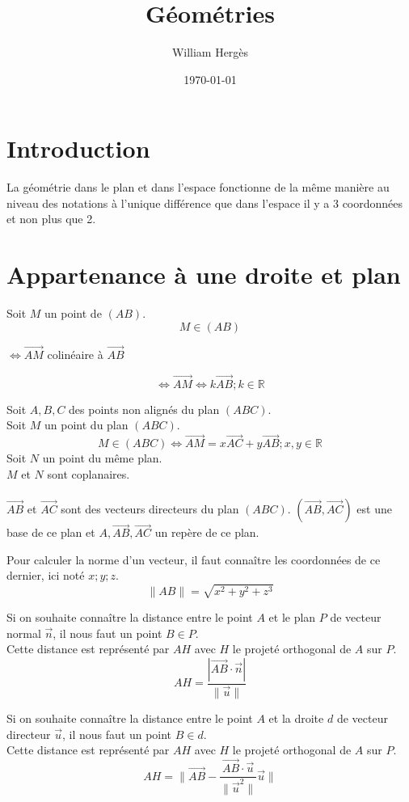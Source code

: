 \documentclass{article}
\title{Géométries}
\author{William Hergès}
\date{\today}
\begin{document}
	\maketitle

	\section{Introduction}

	La géométrie dans le plan et dans l'espace fonctionne de la même manière au niveau des notations à l'unique différence que dans l'espace il y a 3 coordonnées et non plus que 2.

	\section{Appartenance à une droite et plan}

	Soit $M$ un point de $(AB)$.
	\[M \in (AB) \] \begin{center} $\Leftrightarrow \vec{AM}$ colinéaire à $\vec{AB}$ \end{center}
	\[\Leftrightarrow \vec{AM} \Leftrightarrow k\vec{AB} ; k \in \mathbb{R}\]

	Soit $A,B,C$ des points non alignés du plan $(ABC)$. \\
	Soit $M$ un point du plan $(ABC)$.
	\[
		M \in (ABC) \Leftrightarrow \vec{AM} = x\vec{AC} + y\vec{AB} ; x,y \in \mathbb{R}
	\]
	Soit $N$ un point du même plan. \\
	$M$ et $N$ sont coplanaires. \\
	\\
	$\vec{AB}$ et $\vec{AC}$ sont des vecteurs directeurs du plan $(ABC)$. $(\vec{AB}, \vec{AC})$ est une base de ce plan et $A, \vec{AB}, \vec{AC}$ un repère de ce plan.

	Pour calculer la norme d'un vecteur, il faut connaître les coordonnées de ce dernier, ici noté $x;y;z$.
	\[ \|AB\| = \sqrt{x^2+y^2+z^3} \]

	Si on souhaite connaître la distance entre le point $A$ et le plan $P$ de vecteur normal $\vec{n}$, il nous faut un point $B \in P$. \\
	Cette distance est représenté par $AH$ avec $H$ le projeté orthogonal de $A$ sur $P$.
	\[ AH = \frac{|\vec{AB} \cdot \vec{n}|}{\|\vec{u}\|} \]

	Si on souhaite connaître la distance entre le point $A$ et la droite $d$ de vecteur directeur $\vec{u}$, il nous faut un point $B \in d$. \\
	Cette distance est représenté par $AH$ avec $H$ le projeté orthogonal de $A$ sur $P$.
	\[ AH = \|\vec{AB}-\frac{\vec{AB}\cdot\vec{u}}{\|\vec{u}^2\|}\vec{u}\| \]
\end{document}
